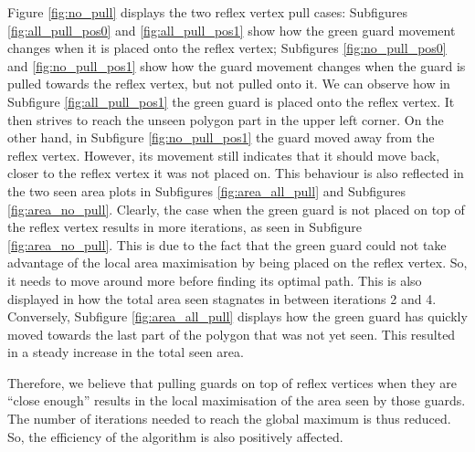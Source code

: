 Figure \ref{fig:no_pull} displays the two reflex vertex pull cases: Subfigures \ref{fig:all_pull_pos0} and \ref{fig:all_pull_pos1} show how the green guard movement changes when it is placed onto the reflex vertex; Subfigures \ref{fig:no_pull_pos0} and \ref{fig:no_pull_pos1} show how the guard movement changes when the guard is pulled towards the reflex vertex, but not pulled onto it. We can observe how in Subfigure \ref{fig:all_pull_pos1} the green guard is placed onto the reflex vertex. It then strives to reach the unseen polygon part in the upper left corner. On the other hand, in Subfigure \ref{fig:no_pull_pos1} the guard moved away from the reflex vertex. However, its movement still indicates that it should move back, closer to the reflex vertex it was not placed on. 
This behaviour is also reflected in the two seen area plots in Subfigures \ref{fig:area_all_pull} and Subfigures \ref{fig:area_no_pull}. Clearly, the case when the green guard is not placed on top of the reflex vertex results in more iterations, as seen in Subfigure \ref{fig:area_no_pull}. This is due to the fact that the green guard could not take advantage of the local area maximisation by being placed on the reflex vertex. So, it needs to move around more before finding its optimal path. This is also displayed in how the total area seen stagnates in between iterations 2 and 4. Conversely, Subfigure \ref{fig:area_all_pull} displays how the green guard has quickly moved towards the last part of the polygon that was not yet seen. This resulted in a steady increase in the total seen area.

Therefore, we believe that pulling guards on top of reflex vertices when they are ``close enough'' results in the local maximisation of the area seen by those guards. The number of iterations needed to reach the global maximum is thus reduced. So, the efficiency of the algorithm is also positively affected.

